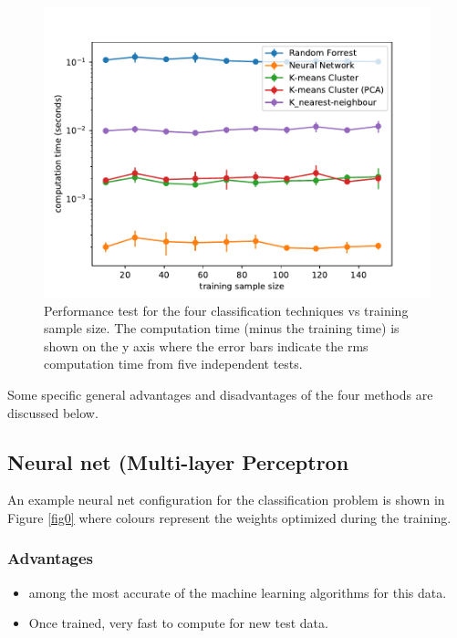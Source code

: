 \documentclass[10pt]{article}
\begin{document}
\begin{figure}
\begin{center}
\includegraphics[scale=1.0,angle=0,trim=0cm 0cm 0cm 0cm]{comparison_time.pdf}
\caption{Performance test for the four classification techniques vs training sample size. The computation time (minus the training time) is shown on the y axis where the error bars indicate the rms computation time from five independent tests.}
\label{fig_comptime}
\end{center}
\end{figure} 





Some specific general advantages and disadvantages of the four methods are discussed below.

\subsection{Neural net (Multi-layer Perceptron}
An example neural net configuration for the classification problem is shown in Figure \ref{fig0} where colours represent the weights optimized during the training.


\subsubsection{Advantages}
\begin{itemize} 

\item among the most accurate of the machine learning algorithms for this data.

\item Once trained, very fast to compute for new test data. 

\end{itemize}
\end{document}
